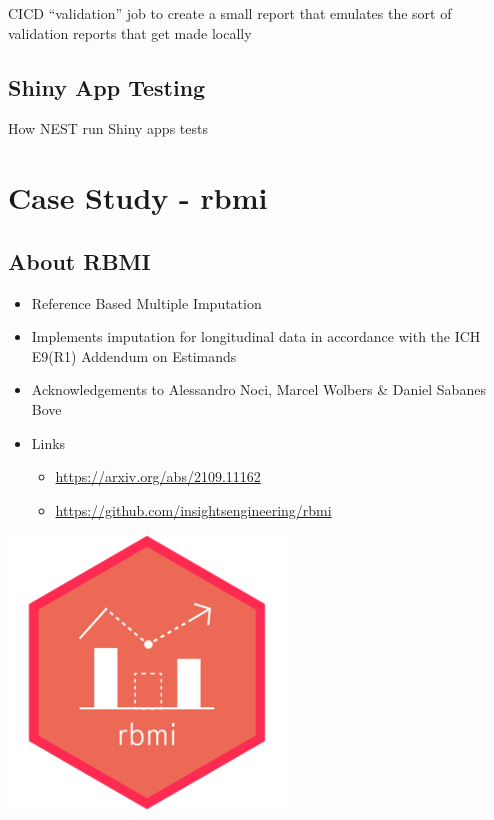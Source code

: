 \documentclass[
  letterpaper,
  DIV=11,
  numbers=noendperiod]{scrartcl}
\providecommand{\tightlist}{%
  \setlength{\itemsep}{0pt}\setlength{\parskip}{0pt}}\usepackage{longtable,booktabs,array}
\begin{document}
CICD ``validation'' job to create a small report that emulates the sort
of validation reports that get made locally

\hypertarget{shiny-app-testing}{%
\subsection{Shiny App Testing}\label{shiny-app-testing}}

How NEST run Shiny apps tests

\hypertarget{case-study---rbmi}{%
\section{Case Study - rbmi}\label{case-study---rbmi}}

\hypertarget{about-rbmi}{%
\subsection{About RBMI}\label{about-rbmi}}

\begin{itemize}
\tightlist
\item
  Reference Based Multiple Imputation
\item
  Implements imputation for longitudinal data in accordance with the ICH
  E9(R1) Addendum on Estimands
\item
  Acknowledgements to Alessandro Noci, Marcel Wolbers \& Daniel Sabanes
  Bove
\item
  Links

  \begin{itemize}
  \tightlist
  \item
    \url{https://arxiv.org/abs/2109.11162}
  \item
    \url{https://github.com/insightsengineering/rbmi}
  \end{itemize}
\end{itemize}

\includegraphics{rbmi.png}
\end{document}
